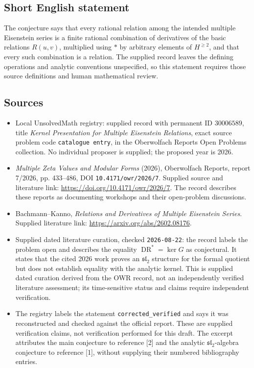 \documentclass[11pt]{article}
\begin{document}
\subsection{Short English statement}
The conjecture says that every rational relation among the intended multiple Eisenstein series is a finite rational combination of derivatives of the basic relations \(R(u,v)\), multiplied using \(*\) by arbitrary elements of \(H^{\geq 2}\), and that every such combination is a relation. The supplied record leaves the defining operations and analytic conventions unspecified, so this statement requires those source definitions and human mathematical review.
\subsection{Sources}
\begin{itemize}
\item Local UnsolvedMath registry: supplied record with permanent ID \(30006589\), title \emph{Kernel Presentation for Multiple Eisenstein Relations}, exact source problem code \texttt{catalogue entry}, in the Oberwolfach Reports Open Problems collection. No individual proposer is supplied; the proposed year is 2026.
\item \emph{Multiple Zeta Values and Modular Forms} (2026), Oberwolfach Reports, report 7/2026, pp. 433--486, DOI \texttt{10.4171/owr/2026/7}. Supplied source and literature link: \url{https://doi.org/10.4171/owr/2026/7}. The record describes these reports as documenting workshops and their open-problem discussions.
\item Bachmann--Kanno, \emph{Relations and Derivatives of Multiple Eisenstein Series}. Supplied literature link: \url{https://arxiv.org/abs/2602.08176}.
\item Supplied dated literature curation, checked \texttt{2026-08-22}: the record labels the problem open and describes the equality \(\operatorname{DR}^{*}=\ker G\) as conjectural. It states that the cited 2026 work proves an \(\mathfrak{sl}_2\) structure for the formal quotient but does not establish equality with the analytic kernel. This is supplied dated curation derived from the OWR record, not an independently verified literature assessment; its time-sensitive status and claims require independent verification.
\item The registry labels the statement \texttt{corrected\_verified} and says it was reconstructed and checked against the official report. These are supplied verification claims, not verification performed for this draft. The excerpt attributes the main conjecture to reference [2] and the analytic \(\mathfrak{sl}_2\)-algebra conjecture to reference [1], without supplying their numbered bibliography entries.
\end{itemize}
\end{document}
